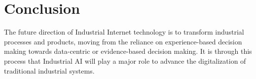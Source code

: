 \chapter*{Conclusion}
\thispagestyle{empty}

The future direction of Industrial Internet technology is to transform industrial processes and products, moving from the reliance on experience-based decision making towards data-centric or evidence-based decision making. It is through this process that Industrial AI will play a major role to advance the digitalization of traditional industrial systems.

\clearpage